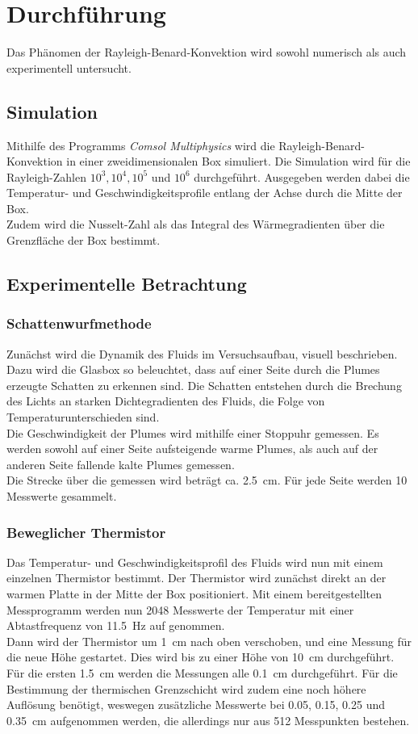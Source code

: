 \section{Durchführung}
Das Phänomen der Rayleigh-Benard-Konvektion wird sowohl numerisch als auch experimentell untersucht.
\subsection{Simulation}
Mithilfe des Programms \emph{Comsol Multiphysics} wird die Rayleigh-Benard-Konvektion in einer zweidimensionalen Box simuliert. 
Die Simulation wird für die Rayleigh-Zahlen $10^3, 10^4, 10^5$ und $10^6$ durchgeführt. 
Ausgegeben werden dabei die Temperatur- und Geschwindigkeitsprofile entlang der Achse durch die Mitte der Box.
\\
Zudem wird die Nusselt-Zahl als das Integral des Wärmegradienten über die Grenzfläche der Box bestimmt.

\subsection{Experimentelle Betrachtung}
\subsubsection{Schattenwurfmethode}
Zunächst wird die Dynamik des Fluids im Versuchsaufbau, visuell beschrieben.
Dazu wird die Glasbox so beleuchtet, dass auf einer Seite durch die Plumes erzeugte Schatten zu erkennen sind.
Die Schatten entstehen durch die Brechung des Lichts an starken Dichtegradienten des Fluids, die Folge von Temperaturunterschieden sind.
\\
Die Geschwindigkeit der Plumes wird mithilfe einer Stoppuhr gemessen. 
Es werden sowohl auf einer Seite aufsteigende warme Plumes, als auch auf der anderen Seite fallende kalte Plumes gemessen.
\\
Die Strecke über die gemessen wird beträgt ca. 2.5~cm. Für jede Seite werden 10 Messwerte gesammelt.
\subsubsection{Beweglicher Thermistor}
Das Temperatur- und Geschwindigkeitsprofil des Fluids wird nun mit einem einzelnen Thermistor bestimmt.
Der Thermistor wird zunächst direkt an der warmen Platte in der Mitte der Box positioniert. 
Mit einem bereitgestellten Messprogramm werden nun 2048 Messwerte der Temperatur mit einer Abtastfrequenz von 11.5~Hz auf genommen. 
\\ 
Dann wird der Thermistor um 1~cm nach oben verschoben, und eine Messung für die neue Höhe gestartet. Dies wird bis zu einer Höhe von 10~cm durchgeführt.
\\
Für die ersten 1.5~cm werden die Messungen alle 0.1~cm durchgeführt. 
Für die Bestimmung der thermischen Grenzschicht wird zudem eine noch höhere Auflösung benötigt, weswegen zusätzliche Messwerte bei 0.05, 0.15, 0.25 und 0.35~cm aufgenommen werden, die allerdings nur aus 512 Messpunkten bestehen.

